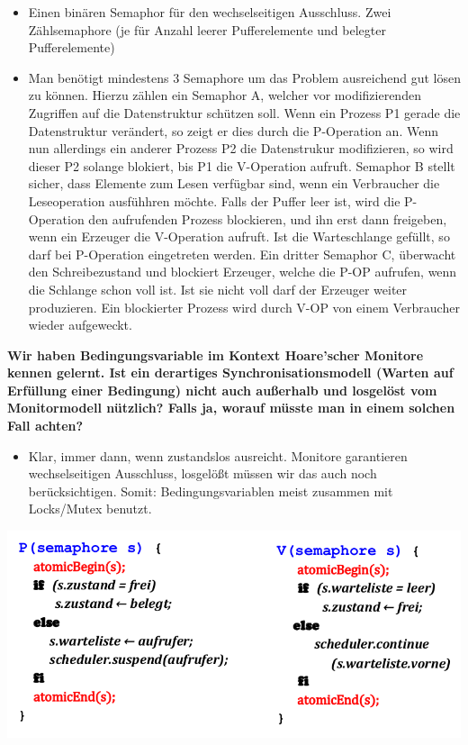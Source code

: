 \documentclass[a4paper]{article}
\begin{document}
\begin{description*}
\begin{itemize}
        \item Einen binären Semaphor für den wechselseitigen Ausschluss. Zwei Zählsemaphore (je für Anzahl leerer Pufferelemente und belegter Pufferelemente)
        \item Man benötigt mindestens 3 Semaphore um das Problem ausreichend gut lösen zu können. Hierzu zählen ein Semaphor A, welcher vor modifizierenden Zugriffen auf die Datenstruktur schützen soll. Wenn ein Prozess P1 gerade die Datenstruktur verändert, so zeigt er dies durch die P-Operation an. Wenn nun allerdings ein anderer Prozess P2 die Datenstrukur modifizieren, so wird dieser P2 solange blokiert, bis P1 die V-Operation aufruft. Semaphor B stellt sicher, dass Elemente zum Lesen verfügbar sind, wenn ein Verbraucher die Leseoperation ausfühhren möchte. Falls der Puffer leer ist, wird die P-Operation den aufrufenden Prozess blockieren, und ihn erst dann freigeben, wenn ein Erzeuger die V-Operation aufruft. Ist die Warteschlange gefüllt, so darf bei P-Operation eingetreten werden. Ein dritter Semaphor C, überwacht den Schreibezustand und blockiert Erzeuger, welche die P-OP aufrufen, wenn die Schlange schon voll ist. Ist sie nicht voll darf der Erzeuger weiter produzieren. Ein blockierter Prozess wird durch V-OP von einem Verbraucher wieder aufgeweckt.
    \end{itemize}
    \item \textbf{Wir haben Bedingungsvariable im Kontext Hoare’scher Monitore kennen gelernt. Ist ein derartiges Synchronisationsmodell (Warten auf Erfüllung einer Bedingung) nicht auch außerhalb und losgelöst vom Monitormodell nützlich? Falls ja, worauf müsste man in einem solchen Fall achten?}
    \begin{itemize}
        \item Klar, immer dann, wenn zustandslos ausreicht. Monitore garantieren wechselseitigen Ausschluss, losgelößt müssen wir das auch noch berücksichtigen. Somit: Bedingungsvariablen meist zusammen mit Locks/Mutex benutzt.
    \end{itemize}
\end{description*}
\begin{center}
    \includegraphics[width=0.8\linewidth]{Assets/Betriebssysteme_uebung/u4_a1.png}
\end{center}
\end{document}
